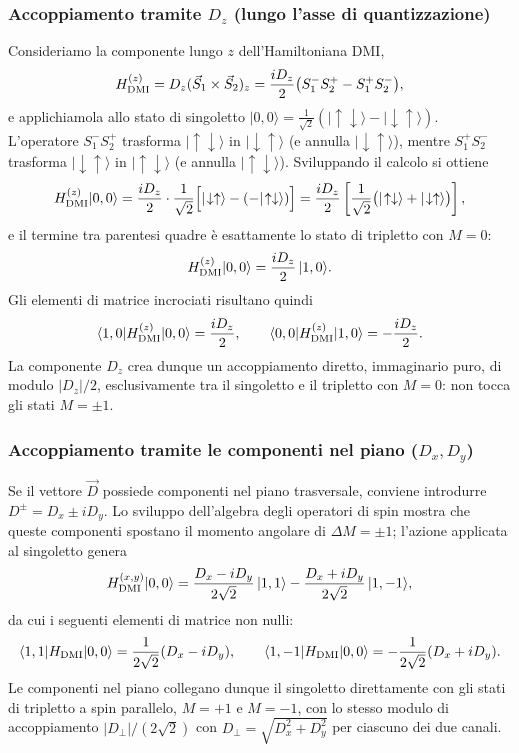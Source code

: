 \documentclass[11pt,a4paper]{article}
\begin{document}
\subsubsection{Accoppiamento tramite $D_z$ (lungo l'asse di quantizzazione)}

Consideriamo la componente lungo $z$ dell'Hamiltoniana DMI,
$$H_{\rm DMI}^{(z)} = D_z(\vec S_1\times\vec S_2)_z = \frac{iD_z}{2}\big(S_1^-S_2^+-S_1^+S_2^-\big),$$
e applichiamola allo stato di singoletto $|0,0\rangle=\tfrac1{\sqrt2}(|\!\uparrow\downarrow\rangle-|\!\downarrow\uparrow\rangle)$.
L'operatore $S_1^-S_2^+$ trasforma $|\!\uparrow\downarrow\rangle$ in
$|\!\downarrow\uparrow\rangle$ (e annulla $|\!\downarrow\uparrow\rangle$), mentre
$S_1^+S_2^-$ trasforma $|\!\downarrow\uparrow\rangle$ in $|\!\uparrow\downarrow\rangle$
(e annulla $|\!\uparrow\downarrow\rangle$). Sviluppando il calcolo si ottiene
$$H_{\rm DMI}^{(z)}|0,0\rangle = \frac{iD_z}{2}\cdot\frac1{\sqrt2}\Big[|\!\downarrow\uparrow\rangle-(-|\!\uparrow\downarrow\rangle)\Big] = \frac{iD_z}{2}\left[\frac1{\sqrt2}\big(|\!\uparrow\downarrow\rangle+|\!\downarrow\uparrow\rangle\big)\right],$$
e il termine tra parentesi quadre \`e esattamente lo stato di tripletto con $M=0$:
$$H_{\rm DMI}^{(z)}|0,0\rangle = \frac{iD_z}{2}\,|1,0\rangle.$$
Gli elementi di matrice incrociati risultano quindi
$$\langle1,0|H_{\rm DMI}^{(z)}|0,0\rangle = \frac{iD_z}{2}, \qquad \langle0,0|H_{\rm DMI}^{(z)}|1,0\rangle = -\frac{iD_z}{2}.$$
La componente $D_z$ crea dunque un accoppiamento diretto, immaginario puro, di modulo
$|D_z|/2$, esclusivamente tra il singoletto e il tripletto con $M=0$: non tocca gli
stati $M=\pm1$.

\subsubsection{Accoppiamento tramite le componenti nel piano ($D_x,D_y$)}

Se il vettore $\vec D$ possiede componenti nel piano trasversale, conviene introdurre
$D^\pm=D_x\pm iD_y$. Lo sviluppo dell'algebra degli operatori di spin mostra che
queste componenti spostano il momento angolare di $\Delta M=\pm1$; l'azione applicata
al singoletto genera
$$H_{\rm DMI}^{(x,y)}|0,0\rangle = \frac{D_x-iD_y}{2\sqrt2}\,|1,1\rangle - \frac{D_x+iD_y}{2\sqrt2}\,|1,-1\rangle,$$
da cui i seguenti elementi di matrice non nulli:
$$\langle1,1|H_{\rm DMI}|0,0\rangle = \frac{1}{2\sqrt2}(D_x-iD_y), \qquad \langle1,-1|H_{\rm DMI}|0,0\rangle = -\frac{1}{2\sqrt2}(D_x+iD_y).$$
Le componenti nel piano collegano dunque il singoletto direttamente con gli stati di
tripletto a spin parallelo, $M=+1$ e $M=-1$, con lo stesso modulo di accoppiamento
$|D_\perp|/(2\sqrt2)$ con $D_\perp=\sqrt{D_x^2+D_y^2}$ per ciascuno dei due canali.
\end{document}
